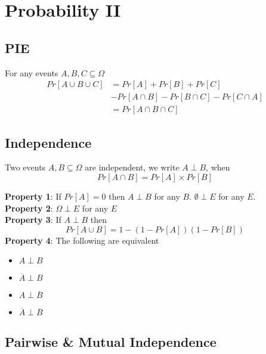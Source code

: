 \chapter{Probability II}

\section{PIE}
\begin{framed}
   For any events $A, B, C \subseteq \Omega$
   \begin{align*}
      Pr[A \cup B \cup C] &= Pr[A] + Pr[B] + Pr[C] \\ 
                          &- Pr[A \cap B] - Pr[B \cap C] - Pr[C \cap A]\\
                          &= Pr[A \cap B \cap C]
   \end{align*}
\end{framed}

\section{Independence}

\begin{framed}
   Two events $A, B \subseteq \Omega$ are independent, we write $A \perp B$, when
    \[
       Pr[A \cap B ] = Pr[A] \times Pr[B]
   \] 

   \textbf{Property 1}:  If $Pr[A] = 0$ then  $A \perp B$ for any  $B$.  $\emptyset \perp E$ for any $E$. \\ 

   \textbf{Property 2}: $\Omega \perp E$ for any $E$ \\

   \textbf{Property 3}: If $A \perp B$ then 
    \[
       Pr[A \cup B] = 1 - (1 - Pr[A]) (1 - Pr[B])
   \] 
   \textbf{Property 4}: The following are equivalent
   \begin{itemize}
      \item $A \perp B$
      \item $\overline{A} \perp B$
      \item ${A} \perp \overline{B}$ 
      \item $\overline{A} \perp \overline{B}$
   \end{itemize}
\end{framed}

\section{Pairwise \& Mutual Independence}

